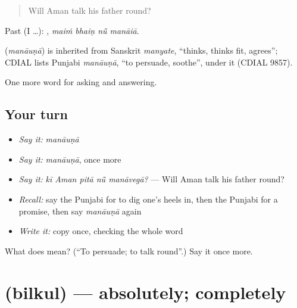 \begin{quote}
Will Aman talk his father round?
\end{quote}

Past (I …):    , \emph{maiṁ bhaiṇ nū̃ manāiā}.

\begin{cousinweb}
\textbf{} (\emph{manāuṇā}) is inherited from Sanskrit \emph{manyate}, \textquotedblleft{}thinks, thinks fit, agrees\textquotedblright{}; CDIAL lists Punjabi \emph{manāuṇā}, \textquotedblleft{}to persuade, soothe\textquotedblright{}, under it (CDIAL 9857).
\end{cousinweb}

\begin{grammarlens}[title={What you've built}]
One more word for asking and answering.
\end{grammarlens}

\subsection*{Your turn}
\begin{itemize}
\raggedright
  \item \emph{Say it:} \emph{manāuṇā}
  \item \emph{Say it:} \emph{manāuṇā}, once more
  \item \emph{Say it:} \emph{kī Aman pitā nū̃ manāvegā?} — Will Aman talk his father round?
  \item \emph{Recall:} say the Punjabi for to dig one's heels in, then the Punjabi for a promise, then say \emph{manāuṇā} again
  \item \emph{Write it:} copy \textbf{} once, checking the whole word
\end{itemize}

\begin{tcolorbox}[breakable,colback=teal!4,colframe=teal!35!black,title={Before you move on}]
What does  mean? (\textquotedblleft{}To persuade; to talk round\textquotedblright{}.) Say it once more.
\end{tcolorbox}
\section[\texorpdfstring{\pa{ਬਿਲਕੁਲ} (bilkul)}{ਬਿਲਕੁਲ (bilkul)}]{ (bilkul) — absolutely; completely}

\label{lesson:PA-C340-bilkul}




